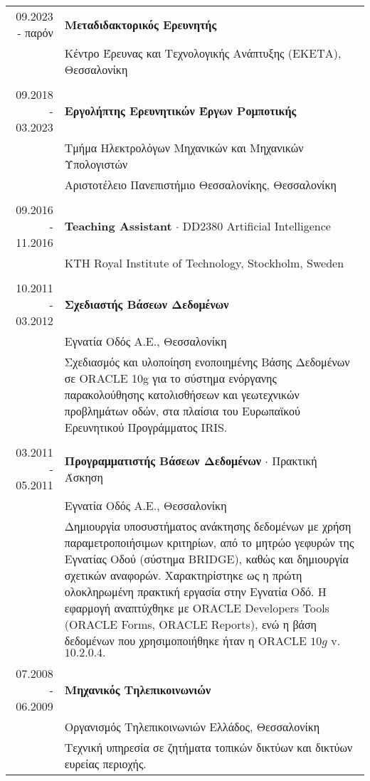 \documentclass[a4paper,10pt,twoside]{article}
\begin{document}
\begin{tabular}{rp{12cm}}
09.2023 - \hfill παρόν \hfill & \textbf{Μεταδιδακτορικός Ερευνητής} \\
                              &  Κέντρο Έρευνας και Τεχνολογικής Ανάπτυξης (ΕΚΕΤΑ), Θεσσαλονίκη\\
&\\
09.2018 - 03.2023 & \textbf{Εργολήπτης Ερευνητικών Έργων Ρομποτικής} \\
                  & Τμήμα Ηλεκτρολόγων Μηχανικών και Μηχανικών Υπολογιστών \\
                  & Αριστοτέλειο Πανεπιστήμιο Θεσσαλονίκης, Θεσσαλονίκη\\
&\\
09.2016 - 11.2016 & \textbf{Teaching Assistant} $\cdot$ DD2380 Artificial Intelligence \\
                  & KTH Royal Institute of Technology, Stockholm, Sweden\\
&\\
10.2011 - 03.2012 & \textbf{Σχεδιαστής Βάσεων Δεδομένων} \\
                  & Εγνατία Οδός Α.Ε., Θεσσαλονίκη \\
                  & Σχεδιασμός και υλοποίηση ενοποιημένης Βάσης Δεδομένων σε ORACLE 10g για
                    το σύστημα ενόργανης παρακολούθησης κατολισθήσεων και γεωτεχνικών προβλημάτων οδών,
                    στα πλαίσια του Ευρωπαϊκού Ερευνητικού Προγράμματος IRIS. \\
&\\
03.2011 - 05.2011 & \textbf{Προγραμματιστής Βάσεων Δεδομένων} $\cdot$ Πρακτική Άσκηση \\
                  & Εγνατία Οδός Α.Ε., Θεσσαλονίκη \\
                  & Δημιουργία υποσυστήματος ανάκτησης δεδομένων με χρήση παραμετροποιήσιμων
                    κριτηρίων, από το μητρώο γεφυρών της Εγνατίας Οδού (σύστημα BRIDGE), καθώς και
                    δημιουργία σχετικών αναφορών. Χαρακτηρίστηκε ως η πρώτη ολοκληρωμένη πρακτική
                    εργασία στην Εγνατία Οδό. Η εφαρμογή αναπτύχθηκε με ORACLE Developers Tools
                    (ORACLE Forms, ORACLE Reports), ενώ η βάση δεδομένων που χρησιμοποιήθηκε ήταν η ORACLE $10g$ v. $10.2.0.4.$\\
&\\
07.2008 - 06.2009 & \textbf{Μηχανικός Τηλεπικοινωνιών} \\
                  & Οργανισμός Τηλεπικοινωνιών Ελλάδος, Θεσσαλονίκη\\
                  & Τεχνική υπηρεσία σε ζητήματα τοπικών δικτύων και δικτύων ευρείας περιοχής. \\
\end{tabular} \\
\end{document}

